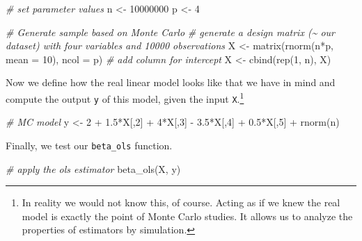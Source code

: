 \documentclass[
  12pt,
]{style/krantz}
\newenvironment{Shaded}{\begin{snugshade}}{\end{snugshade}}
\newcommand{\AttributeTok}[1]{\textcolor[rgb]{0.77,0.63,0.00}{#1}}
\newcommand{\CommentTok}[1]{\textcolor[rgb]{0.56,0.35,0.01}{\textit{#1}}}
\newcommand{\DecValTok}[1]{\textcolor[rgb]{0.00,0.00,0.81}{#1}}
\newcommand{\FloatTok}[1]{\textcolor[rgb]{0.00,0.00,0.81}{#1}}
\newcommand{\FunctionTok}[1]{\textcolor[rgb]{0.00,0.00,0.00}{#1}}
\newcommand{\NormalTok}[1]{#1}
\newcommand{\OtherTok}[1]{\textcolor[rgb]{0.56,0.35,0.01}{#1}}
\newcommand{\SpecialCharTok}[1]{\textcolor[rgb]{0.00,0.00,0.00}{#1}}
\begin{document}
\begin{Shaded}
\begin{Highlighting}[]
\CommentTok{\# set parameter values}
\NormalTok{n }\OtherTok{\textless{}{-}} \DecValTok{10000000}
\NormalTok{p }\OtherTok{\textless{}{-}} \DecValTok{4} 

\CommentTok{\# Generate sample based on Monte Carlo}
\CommentTok{\# generate a design matrix (\textasciitilde{} our \textquotesingle{}dataset\textquotesingle{}) with four variables and 10000 observations}
\NormalTok{X }\OtherTok{\textless{}{-}} \FunctionTok{matrix}\NormalTok{(}\FunctionTok{rnorm}\NormalTok{(n}\SpecialCharTok{*}\NormalTok{p, }\AttributeTok{mean =} \DecValTok{10}\NormalTok{), }\AttributeTok{ncol =}\NormalTok{ p)}
\CommentTok{\# add column for intercept}
\NormalTok{X }\OtherTok{\textless{}{-}} \FunctionTok{cbind}\NormalTok{(}\FunctionTok{rep}\NormalTok{(}\DecValTok{1}\NormalTok{, n), X)}
\end{Highlighting}
\end{Shaded}

Now we define how the real linear model looks like that we have in mind and compute the output \texttt{y} of this model, given the input \texttt{X}.\footnote{In reality we would not know this, of course. Acting as if we knew the real model is exactly the point of Monte Carlo studies. It allows us to analyze the properties of estimators by simulation.}

\begin{Shaded}
\begin{Highlighting}[]
\CommentTok{\# MC model}
\NormalTok{y }\OtherTok{\textless{}{-}} \DecValTok{2} \SpecialCharTok{+} \FloatTok{1.5}\SpecialCharTok{*}\NormalTok{X[,}\DecValTok{2}\NormalTok{] }\SpecialCharTok{+} \DecValTok{4}\SpecialCharTok{*}\NormalTok{X[,}\DecValTok{3}\NormalTok{] }\SpecialCharTok{{-}} \FloatTok{3.5}\SpecialCharTok{*}\NormalTok{X[,}\DecValTok{4}\NormalTok{] }\SpecialCharTok{+} \FloatTok{0.5}\SpecialCharTok{*}\NormalTok{X[,}\DecValTok{5}\NormalTok{] }\SpecialCharTok{+} \FunctionTok{rnorm}\NormalTok{(n)}
\end{Highlighting}
\end{Shaded}

Finally, we test our \texttt{beta\_ols} function.

\begin{Shaded}
\begin{Highlighting}[]
\CommentTok{\# apply the ols estimator}
\FunctionTok{beta\_ols}\NormalTok{(X, y)}
\end{Highlighting}
\end{Shaded}
\end{document}
